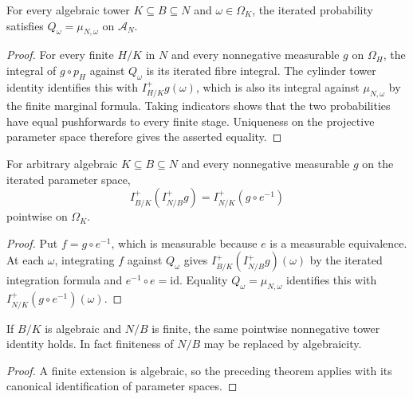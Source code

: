 \begin{lemma}\label{lem:algebraic-tower-probability-equality}
\leanok
{}
For every algebraic tower $K\subseteq B\subseteq N$ and
$\omega\in\Omega_K$, the iterated probability satisfies
$Q_\omega=\mu_{N,\omega}$ on $\mathcal A_N$.
\end{lemma}
\begin{proof}
For every finite $H/K$ in $N$ and every nonnegative measurable
$g$ on $\Omega_H$, the integral of $g\circ p_H$ against $Q_\omega$
is its iterated fibre integral. The cylinder tower identity
identifies this with $I^+_{H/K}g(\omega)$, which is also its
integral against $\mu_{N,\omega}$ by the finite marginal formula.
Taking indicators shows that the two probabilities have equal
pushforwards to every finite stage. Uniqueness on the projective
parameter space therefore gives the asserted equality.
\end{proof}

\begin{theorem}\label{thm:algebraic-tower-lintegral}
\leanok
{}
For arbitrary algebraic $K\subseteq B\subseteq N$ and every
nonnegative measurable $g$ on the iterated parameter space,
\[
 I^+_{B/K}(I^+_{N/B}g)
 =I^+_{N/K}(g\circ e^{-1})
\]
pointwise on $\Omega_K$.
\end{theorem}
\begin{proof}
Put $f=g\circ e^{-1}$, which is measurable because $e$ is a
measurable equivalence. At each $\omega$, integrating $f$ against
$Q_\omega$ gives $I^+_{B/K}(I^+_{N/B}g)(\omega)$ by the iterated
integration formula and $e^{-1}\circ e=\mathrm{id}$. Equality
$Q_\omega=\mu_{N,\omega}$ identifies this with
$I^+_{N/K}(g\circ e^{-1})(\omega)$.
\end{proof}

\begin{corollary}\label{lem:algebraic-tower-finite-upper}
\leanok
{}
If $B/K$ is algebraic and $N/B$ is finite, the same pointwise
nonnegative tower identity holds. In fact finiteness of $N/B$
may be replaced by algebraicity.
\end{corollary}
\begin{proof}
A finite extension is algebraic, so the preceding theorem applies
with its canonical identification of parameter spaces.
\end{proof}

